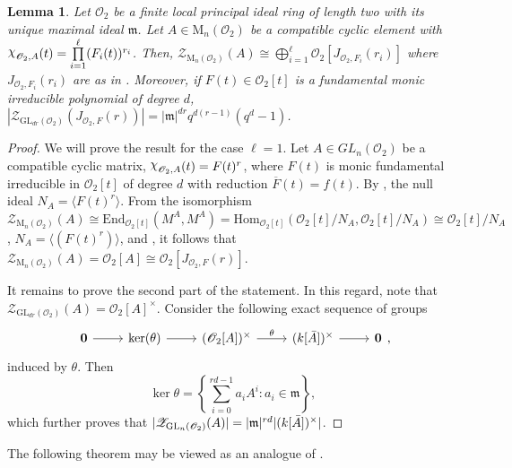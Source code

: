 \documentclass[11pt,twoside]{amsart}
\newcommand{\GL}{\mathrm{GL}}
\newcommand{\M}{\mathrm{M}}
\newcommand{\upchi}{\raisebox{0.4ex}{$\chi$}}
\newcommand{\Char}{\upchi}
\newcommand{\R}{\mathscr{O}_2}
\newcommand{\Zen}{\mathscr{Z}}
\newtheorem{lemma}{Lemma}[section]
\theoremstyle{definition} %
\begin{document}
\begin{lemma}\label{lem:centra-comp-cyc-R}
Let $\R$ be a finite local principal ideal ring of length two with its unique maximal ideal $\mathfrak{m}$. Let $A\in \M_n(\R)$ be a compatible cyclic element with $\Char_{\R, A}(t) =\prod\limits_{i=1}^\ell(F_i(t))^{r_i}$. Then, $\Zen_{\M_n(\R)}(A)\cong \bigoplus\limits_{i=1}^\ell \R[J_{\R,F_i}(r_i)]$ where $J_{\R,F_i}(r_i)$ are as in .
Moreover, if $F(t)\in \R[t]$ is a fundamental monic irreducible polynomial of degree $d$, $\left|\Zen_{\GL_{dr}(\R)}\left(J_{\R,F}(r)\right)\right|=|\mathfrak{m}|^{dr}q^{d(r-1)}(q^d-1)$.
\end{lemma}
\begin{proof}
We will prove the result for the case $\ell=1$.
Let $A\in GL_n(\R)$ be a compatible cyclic matrix, $\Char_{\R,A}(t)=F(t)^r$, where $F(t)$ is monic fundamental irreducible in $\mathcal{O}_2[t]$ of degree $d$ with reduction $\overline{F}(t)=f(t)$.
By , the null ideal $N_A=\langle F(t)^r\rangle$.
From the isomorphism $\Zen_{\M_n(\R)}\left(A\right)\cong \mathrm{End}_{\R[t]}(M^{A},M^{A})
 =\mathrm{Hom}_{\R[t]}( \R[t]/N_A, \R[t]/N_A)\cong \R[t]/N_A$, $N_A=\langle(F(t)^r)\rangle$, and , it follows that $\Zen_{\M_n(\R)}(A)= \R[A]\cong \R[J_{\R,F}(r)]$.

It remains to prove the second part of the statement.
In this regard, note that $\Zen_{\GL_{dr}(\R)}(A)=\R[A]^\times$.
Consider the following exact sequence of groups
$$ \begin{tikzcd}
	\mathbf0 & {\ker(\theta)} & {(\R[A])^{\times}} & {(k[\Bar{A}])^{\times}} & \mathbf 0
	\arrow[from=1-1, to=1-2]
	\arrow[from=1-2, to=1-3]
	\arrow["{\theta}", from=1-3, to=1-4]
	\arrow[from=1-4, to=1-5]
\end{tikzcd},$$
induced by $\theta$.
Then $$\ker\theta=\left\{\sum\limits_{i=0}^{rd-1}a_iA^i:a_i\in\mathfrak{m}\right\},$$ which further proves that $|\Zen_{\GL_n(\R)}(A)|=|\mathfrak{m}|^{rd}|(k[\Bar{A}])^{\times}|$.
\end{proof}
The following theorem may be viewed as an analogue of \cite[Theorem 5.3(2)]{KunduSinghGL}.
\theoremfour*
\end{document}
